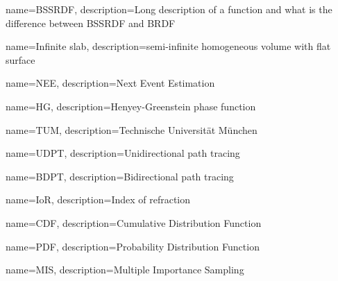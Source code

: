 {
    name={BSSRDF},
    description={Long description of a function and what is the difference
    between BSSRDF and BRDF}
}

{
    name={Infinite slab},
    description={semi-infinite homogeneous volume with flat surface}
}

{
    name={NEE},
    description={Next Event Estimation}
}

{
    name={HG},
    description={Henyey-Greenstein phase function}
}

{
    name={TUM},
    description={Technische Universität München}
}

{
    name={UDPT},
    description={Unidirectional path tracing}
}

{
    name={BDPT},
    description={Bidirectional path tracing}
}

{
    name={IoR},
    description={Index of refraction}
}

{
    name={CDF},
    description={Cumulative Distribution Function}
}

{
    name={PDF},
    description={Probability Distribution Function}
}

{
    name={MIS},
    description={Multiple Importance Sampling}
}